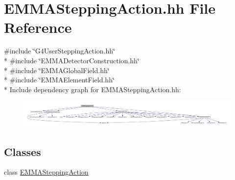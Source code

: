 \hypertarget{EMMASteppingAction_8hh}{}\section{E\+M\+M\+A\+Stepping\+Action.\+hh File Reference}
\label{EMMASteppingAction_8hh}
{\ttfamily \#include \char`\"{}G4\+User\+Stepping\+Action.\+hh\char`\"{}}\\*
{\ttfamily \#include \char`\"{}E\+M\+M\+A\+Detector\+Construction.\+hh\char`\"{}}\\*
{\ttfamily \#include \char`\"{}E\+M\+M\+A\+Global\+Field.\+hh\char`\"{}}\\*
{\ttfamily \#include \char`\"{}E\+M\+M\+A\+Element\+Field.\+hh\char`\"{}}\\*
Include dependency graph for E\+M\+M\+A\+Stepping\+Action.\+hh\+:
\nopagebreak
\begin{figure}[H]
\begin{center}
\leavevmode
\includegraphics[width=350pt]{EMMASteppingAction_8hh__incl}
\end{center}
\end{figure}
\subsection*{Classes}
\begin{DoxyCompactItemize}
\item 
class \hyperlink{classEMMASteppingAction}{E\+M\+M\+A\+Stepping\+Action}
\end{DoxyCompactItemize}

